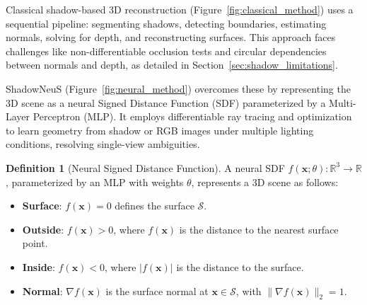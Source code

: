 \documentclass[12pt]{article}
\theoremstyle{definition}
\newtheorem{definition}{Definition}[subsection]
\begin{document}
Classical shadow-based 3D reconstruction (Figure~\ref{fig:classical_method}) uses a sequential pipeline: segmenting shadows, detecting boundaries, estimating normals, solving for depth, and reconstructing surfaces. This approach faces challenges like non-differentiable occlusion tests and circular dependencies between normals and depth, as detailed in Section~\ref{sec:shadow_limitations}.

ShadowNeuS (Figure~\ref{fig:neural_method}) overcomes these by representing the 3D scene as a neural Signed Distance Function (SDF) parameterized by a Multi-Layer Perceptron (MLP). It employs differentiable ray tracing and optimization to learn geometry from shadow or RGB images under multiple lighting conditions, resolving single-view ambiguities.

\begin{definition}[Neural Signed Distance Function] \label{def:neural_sdf}
A neural SDF \( f(\mathbf{x}; \theta): \mathbb{R}^3 \to \mathbb{R} \), parameterized by an MLP with weights \(\theta\), represents a 3D scene as follows:
\begin{itemize}
    \item \textbf{Surface}: \( f(\mathbf{x}) = 0 \) defines the surface \( \mathcal{S} \).
    \item \textbf{Outside}: \( f(\mathbf{x}) > 0 \), where \( f(\mathbf{x}) \) is the distance to the nearest surface point.
    \item \textbf{Inside}: \( f(\mathbf{x}) < 0 \), where \( |f(\mathbf{x})| \) is the distance to the surface.
    \item \textbf{Normal}: \( \nabla f(\mathbf{x}) \) is the surface normal at \( \mathbf{x} \in \mathcal{S} \), with \( \|\nabla f(\mathbf{x})\|_2 = 1 \).
\end{itemize}
\end{definition}
\end{document}
